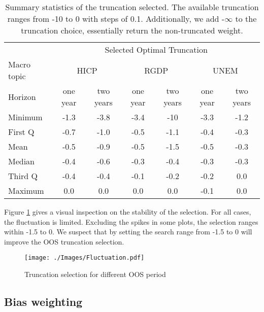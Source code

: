 \documentclass[11pt]{article}
\begin{document}
\begin{table}[!h]
	\centering
	\caption{Summary statistics of the truncation selected. The available truncation ranges from -10 to 0 with steps of 0.1. Additionally, we add -$\infty$ to the truncation choice, essentially return the non-truncated weight.}
	\label{tab: truncation summary statistics}
	\begin{tabular}{lcccccc}%
		\hline
		&\multicolumn{6}{c}{Selected Optimal Truncation}\\
		\cmidrule(lr){2-7}
		Macro topic & \multicolumn{2}{c}{HICP} & \multicolumn{2}{c}{RGDP} & \multicolumn{2}{c}{UNEM} \\
		\cmidrule(lr){2-3} \cmidrule(lr){4-5}\cmidrule(lr){6-7}
		Horizon     & one year & two years & one year & two years & one year & two years \\ 
		\hline
		Minimum     & -1.3        & -3.8        & -3.4        & -10         & -3.3        & -1.2        \\
		First Q     & -0.7        & -1.0        & -0.5        & -1.1        & -0.4        & -0.3        \\
		Mean        & -0.5        & -0.9        & -0.5        & -1.5        & -0.5        & -0.3        \\
		Median      & -0.4        & -0.6        & -0.3        & -0.4        & -0.3        & -0.3        \\
		Third Q     & -0.4        & -0.4        & -0.1        & -0.2        & -0.2        & 0.0         \\
		Maximum     & 0.0         & 0.0         & 0.0         & 0.0         & -0.1         & 0.0         \\ 
		\hline
	\end{tabular}
\end{table}

Figure \ref{fig: fluctuation} gives a visual inspection on the stability of the selection. For all cases, the fluctuation is limited. Excluding the spikes in some plots, the selection ranges within -1.5 to 0. We suspect that by setting the search range from -1.5 to 0 will improve the OOS truncation selection. 

\begin{figure}[!h]
	\centering
	\texttt{[image: ./Images/Fluctuation.pdf]}
	\caption{Truncation selection for different OOS period}\label{fig: fluctuation}
\end{figure}

\subsection{Bias weighting}\label{bias-weighting}
\end{document}
